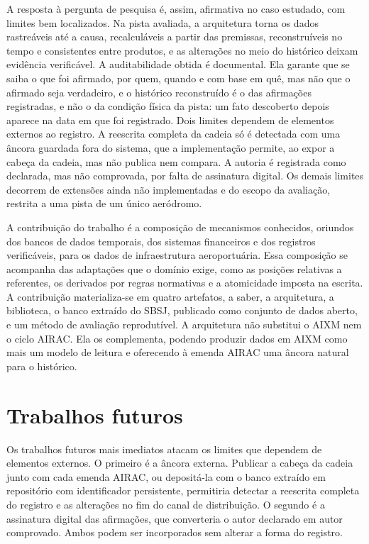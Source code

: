 A resposta à pergunta de pesquisa é, assim, afirmativa no caso estudado, com limites bem localizados. Na pista avaliada, a arquitetura torna os dados rastreáveis até a causa, recalculáveis a partir das premissas, reconstruíveis no tempo e consistentes entre produtos, e as alterações no meio do histórico deixam evidência verificável. A auditabilidade obtida é documental. Ela garante que se saiba o que foi afirmado, por quem, quando e com base em quê, mas não que o afirmado seja verdadeiro, e o histórico reconstruído é o das afirmações registradas, e não o da condição física da pista: um fato descoberto depois aparece na data em que foi registrado. Dois limites dependem de elementos externos ao registro. A reescrita completa da cadeia só é detectada com uma âncora guardada fora do sistema, que a implementação permite, ao expor a cabeça da cadeia, mas não publica nem compara. A autoria é registrada como declarada, mas não comprovada, por falta de assinatura digital. Os demais limites decorrem de extensões ainda não implementadas e do escopo da avaliação, restrita a uma pista de um único aeródromo.

A contribuição do trabalho é a composição de mecanismos conhecidos, oriundos dos bancos de dados temporais, dos sistemas financeiros e dos registros verificáveis, para os dados de infraestrutura aeroportuária. Essa composição se acompanha das adaptações que o domínio exige, como as posições relativas a referentes, os derivados por regras normativas e a atomicidade imposta na escrita. A contribuição materializa-se em quatro artefatos, a saber, a arquitetura, a biblioteca, o banco extraído do SBSJ, publicado como conjunto de dados aberto, e um método de avaliação reprodutível. A arquitetura não substitui o AIXM nem o ciclo AIRAC. Ela os complementa, podendo produzir dados em AIXM como mais um modelo de leitura e oferecendo à emenda AIRAC uma âncora natural para o histórico.

\section{Trabalhos futuros}\label{sec:trabalhos-futuros}

Os trabalhos futuros mais imediatos atacam os limites que dependem de elementos externos. O primeiro é a âncora externa. Publicar a cabeça da cadeia junto com cada emenda AIRAC, ou depositá-la com o banco extraído em repositório com identificador persistente, permitiria detectar a reescrita completa do registro e as alterações no fim do canal de distribuição. O segundo é a assinatura digital das afirmações, que converteria o autor declarado em autor comprovado. Ambos podem ser incorporados sem alterar a forma do registro.

